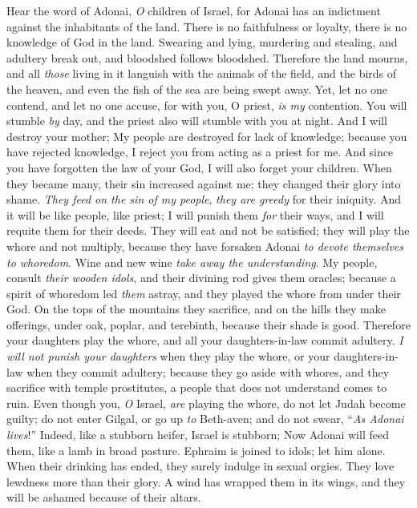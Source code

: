 \begin{biblechapter} %
 Hear the word of Adonai, \textit{O} children of Israel, 
for Adonai has an indictment against the inhabitants of the land. 
There is no faithfulness or loyalty, 
there is no knowledge of God in the land.
\verse Swearing and lying, 
murdering and stealing, 
and adultery break out, 
and bloodshed follows bloodshed.
\verse Therefore the land mourns, 
and all \textit{those} living in it languish 
with the animals of the field, 
and the birds of the heaven, 
and even the fish of the sea 
are being swept away.
\verse Yet, let no one contend, 
and let no one accuse, 
for with you, O priest, \textit{is my} contention.
\verse You will stumble \textit{by} day, 
and the priest also will stumble 
with you at night. 
And I will destroy your mother;
\verse My people are destroyed 
for lack of knowledge; 
because you have rejected knowledge, 
I reject you from acting as a priest for me. 
And since you have forgotten the law of your God, 
I will also forget your children.
\verse When they became many, their sin increased against me; 
they changed their glory into shame.
\verse \textit{They feed on the sin of my people}, 
\textit{they are greedy} for their iniquity.
\verse And it will be like people, like priest; 
I will punish them \textit{for} their ways, 
and I will requite them for their deeds.
\verse They will eat and not be satisfied; 
they will play the whore and not multiply, 
because they have forsaken Adonai \textit{to devote themselves to
\verse whoredom}. 
Wine and new wine \textit{take away the understanding}.
\verse My people, 
consult \textit{their wooden idols}, 
and their divining rod gives them oracles; 
because a spirit of whoredom led \textit{them} astray, 
and they played the whore from under their God.
\verse On the tops of the mountains they sacrifice, 
and on the hills they make offerings, 
under oak, poplar, and terebinth, 
because their shade is good. 
Therefore your daughters play the whore, 
and all your daughters-in-law commit adultery.
\verse \textit{I will not punish your daughters} when they play the whore, 
or your daughters-in-law when they commit adultery; 
because they go aside with whores, 
and they sacrifice with temple prostitutes, 
a people that does not understand comes to ruin.
\verse Even though you, \textit{O} Israel, \textit{are} playing the whore, 
do not let Judah become guilty; 
do not enter Gilgal, 
or go up \textit{to} Beth-aven; 
and do not swear, 
“\textit{As Adonai lives}!”
\verse Indeed, like a stubborn heifer, 
Israel is stubborn; 
Now Adonai will feed them, 
like a lamb in broad pasture.
\verse Ephraim is joined to idols; 
let him alone.
\verse When their drinking has ended, 
they surely indulge in sexual orgies. 
They love lewdness more than their glory.
\verse A wind has wrapped them in its wings, 
and they will be ashamed because of their altars.
\end{biblechapter}

